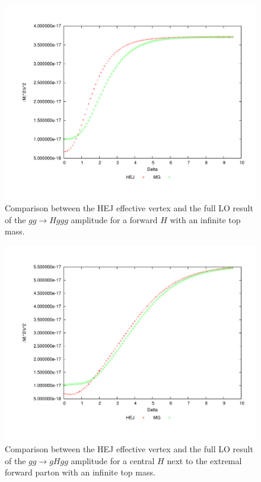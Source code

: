\begin{figure}[t]
\centering
\includegraphics[scale=0.45]{Images/gg_nextfor.pdf}
\caption{Comparison between the HEJ effective vertex and the full LO result of the $gg \to Hggg$ amplitude for a forward $H$ with an infinite top mass.}
\label{fig:gg_ggh_1}
\end{figure}

\begin{figure}[t]
\centering
\includegraphics[scale=0.45]{Images/gg_cen1.pdf}
\caption{Comparison between the HEJ effective vertex and the full LO result of the $gg \to gHgg$ amplitude for a central $H$ next to the extremal forward parton with an infinite top mass.}
\label{fig:gg_ggh_2}
\end{figure}

